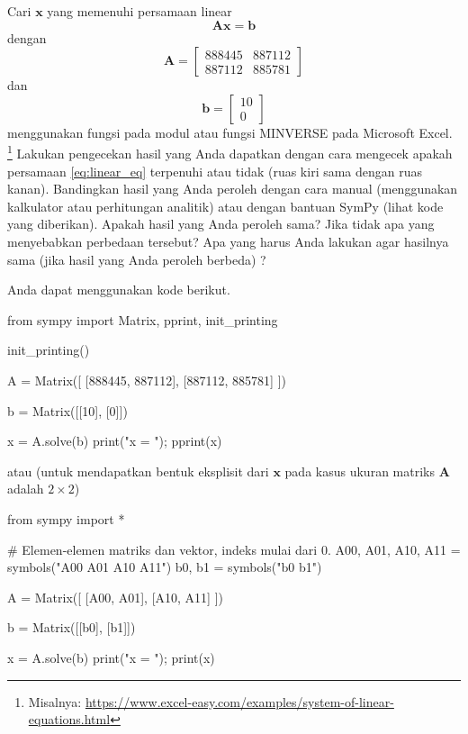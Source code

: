 \begin{soal}
Cari $\mathbf{x}$ yang memenuhi persamaan linear
\begin{equation}
\mathbf{A} \mathbf{x} = \mathbf{b}
\label{eq:linear_eq}
\end{equation}
dengan
\begin{equation*}
\mathbf{A} = \begin{bmatrix}
888445 & 887112\\
887112 & 885781
\end{bmatrix}
\end{equation*}
dan
\begin{equation*}
\mathbf{b} = \begin{bmatrix}
10\\
0
\end{bmatrix}
\end{equation*}
menggunakan fungsi  pada modul 
atau fungsi MINVERSE pada Microsoft Excel.
\footnote{Misalnya: \url{https://www.excel-easy.com/examples/system-of-linear-equations.html}}
Lakukan pengecekan hasil yang Anda
dapatkan dengan cara mengecek apakah persamaan \ref{eq:linear_eq} terpenuhi atau tidak
(ruas kiri sama dengan ruas kanan).
Bandingkan hasil yang Anda peroleh dengan cara manual (menggunakan kalkulator atau
perhitungan analitik) atau dengan bantuan SymPy (lihat kode yang diberikan).
Apakah hasil yang Anda peroleh sama? Jika tidak apa yang
menyebabkan perbedaan tersebut? Apa yang harus Anda lakukan agar hasilnya sama (jika
hasil yang Anda peroleh berbeda) ?
\end{soal}

Anda dapat menggunakan kode berikut.
\begin{pythoncode}
from sympy import Matrix, pprint, init_printing

init_printing()

A = Matrix([
    [888445, 887112],
    [887112, 885781]
])

b = Matrix([[10], [0]])

x = A.solve(b)
print("x = ");
pprint(x)
\end{pythoncode}
atau (untuk mendapatkan bentuk eksplisit dari $\mathbf{x}$ pada kasus
ukuran matriks $\mathbf{A}$ adalah $2\times2$)
\begin{pythoncode}
from sympy import *

# Elemen-elemen matriks dan vektor, indeks mulai dari 0.
A00, A01, A10, A11 = symbols("A00 A01 A10 A11")
b0, b1 = symbols("b0 b1")

A = Matrix([
    [A00, A01],
    [A10, A11]
])

b = Matrix([[b0], [b1]])

x = A.solve(b)
print("x = ");
print(x)
\end{pythoncode}


